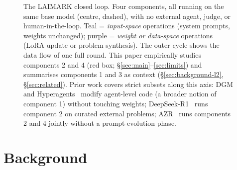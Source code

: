 \documentclass[11pt,a4paper]{article}
\begin{document}
\begin{figure}[t]
\caption{The LAIMARK closed loop.
Four components, all running on the same base model (centre, dashed), with no external agent, judge, or human-in-the-loop.
Teal = \emph{input-space} operations (system prompts, weights unchanged); purple = \emph{weight or data-space} operations (LoRA update or problem synthesis).
The outer cycle shows the data flow of one full round.
This paper empirically studies components 2 and 4 (red box; \S\ref{sec:main}--\ref{sec:limits}) and summarises components 1 and 3 as context (\S\ref{sec:background-l2}, \S\ref{sec:related}).
Prior work covers strict subsets along this axis: DGM and Hyperagents~\citep{zhang2025dgm,zhang2026hyperagents} modify agent-level code (a broader notion of component 1) without touching weights; DeepSeek-R1~\citep{deepseek2025r1} runs component 2 on curated external problems; AZR~\citep{zhao2025azr} runs components 2 and 4 jointly without a prompt-evolution phase.}
\label{fig:loop}
\end{figure}

\section{Background}
\label{sec:background}
\end{document}

